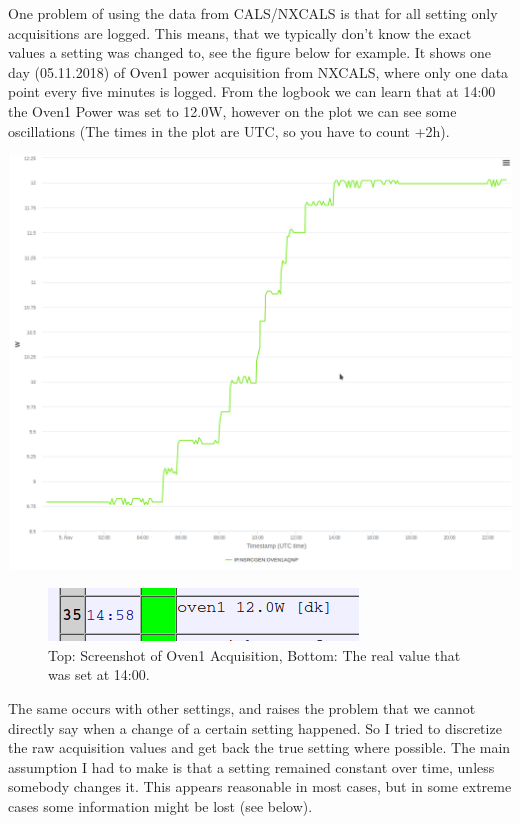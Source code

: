 \documentclass[12pt,a4paper]{article}
\begin{document}
One problem of using the data from CALS/NXCALS is that for all setting only acquisitions are logged. This means, that we typically don't know the exact values a setting was changed to, see the figure below for example. It shows one day (05.11.2018) of Oven1 power acquisition from NXCALS, where only one data point every five minutes is logged. From the logbook we can learn that at 14:00 the Oven1 Power was set to 12.0W, however on the plot we can see some oscillations (The times in the plot are UTC, so you have to count +2h).

\includegraphics{images/oven1example_05112018.png}

\begin{figure}
\centering
\includegraphics{images/oven1example_logbook_05112018.png}
\caption{Top: Screenshot of Oven1 Acquisition, Bottom: The real value that was set at 14:00.}
\end{figure}

The same occurs with other settings, and raises the problem that we cannot directly say when a change of a certain setting happened. So I
tried to discretize the raw acquisition values and get back the true setting where possible. The main assumption I had to make is that a
setting remained constant over time, unless somebody changes it. This appears reasonable in most cases, but in some extreme cases some
information might be lost (see below).
\end{document}
